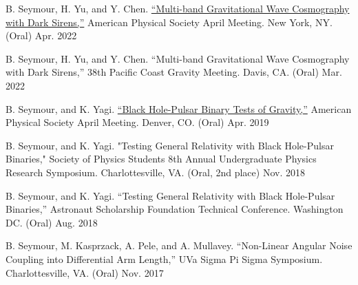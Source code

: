 \begin{cvpresentationsmod}

    \cvpresentation
    {B. Seymour, H. Yu, and Y. Chen. \href{https://meetings.aps.org/Meeting/APR22/Session/Q16.7}{“Multi-band Gravitational Wave Cosmography with Dark Sirens,”} American Physical Society April Meeting. New York, NY. (Oral)}
    {Apr. 2022}
    

    \cvpresentation
    {B. Seymour, H. Yu, and Y. Chen. “Multi-band Gravitational Wave Cosmography with Dark Sirens,” 38th Pacific Coast Gravity Meeting. Davis, CA. (Oral)}
    {Mar. 2022}


    \cvpresentation
    {B. Seymour, and K. Yagi. \href{https://meetings.aps.org/Meeting/APR19/Session/D16.7}{“Black Hole-Pulsar Binary Tests of Gravity,”} American Physical Society April Meeting. Denver, CO. (Oral)}
    {Apr. 2019}
    
  \cvpresentation
    {B. Seymour, and K. Yagi. "Testing General Relativity with Black Hole-Pulsar Binaries," Society of Physics Students 8th Annual Undergraduate Physics Research Symposium. Charlottesville, VA. (Oral, 2nd place)} %
    {Nov. 2018 } %
    
    




  \cvpresentation
    {B. Seymour, and K. Yagi. “Testing General Relativity with Black Hole-Pulsar Binaries,” Astronaut Scholarship Foundation Technical Conference. Washington DC. (Oral)} %
    {Aug. 2018} %



  \cvpresentation
    {B. Seymour, M. Kasprzack, A. Pele, and A. Mullavey. “Non-Linear Angular Noise Coupling into Differential Arm Length,” UVa Sigma Pi Sigma Symposium. Charlottesville, VA. (Oral)} %
    {Nov. 2017} %



\end{cvpresentationsmod}
